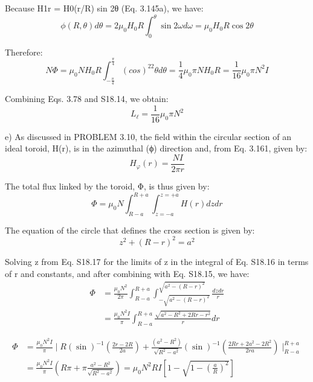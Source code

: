 Because H1r = H0(r/R) sin 2θ (Eq. 3.145a), we have:
 \begin{equation}%
\phi(R,\theta)d\theta=2\mu_0H_0R\int_{0}^{\theta}\sin 2\omega d\omega=\mu_0H_0R\cos 2\theta
\end{equation}

Therefore:
 \begin{equation}%
N\Phi=\mu_0NH_0R\int_{-\frac{\pi}{4}}^{\frac{\pi}{4}}(cos)^22\theta d\theta
=\frac{1}{4}\mu_0\pi NH_0R=\frac{1}{16}\mu_0\pi N^2I
\end{equation}

Combining Eqs. 3.78 and S18.14, we obtain:
 \begin{equation}%
L_\ell=\frac{1}{16}\mu_0\pi N^2
\end{equation}

e) As discussed in PROBLEM 3.10, the field within the circular section of an
ideal toroid, H(r), is in the azimuthal (ϕ) direction and, from Eq. 3.161, given by:
 \begin{equation}%
H_\varphi(r)=\frac{NI}{2\pi r}
\end{equation}


The total flux linked by the toroid, Φ, is thus given by:
 \begin{equation}%
\Phi=\mu_0N\int_{R-a}^{R+a}\int_{z=-a}^{z=+a}H(r)dzdr
\end{equation}

The equation of the circle that defines the cross section is given by:
 \begin{equation}%
z^2+(R-r)^2=a^2
\end{equation}

Solving z from Eq. S18.17 for the limits of z in the integral of Eq. S18.16 in terms
of r and constants, and after combining with Eq. S18.15, we have:
\begin{equation}%
\begin{split}
\Phi&=\frac{\mu_0N^2}{2\pi}\int_{R-a}^{R+a}\int_{-\sqrt{a^2-(R-r)^2}}^{\sqrt{a^2-(R-r)^2}}\frac{dzdr}{r}\\
&=\frac{\mu_0N^2I}{\pi}\int_{R-a}^{R+a}\frac{\sqrt{a^2-R^2+2Rr-r^2}}{r}dr
\end{split}
\end{equation}

\begin{equation}%
\begin{split}
\Phi&=\frac{\mu_0N^2I}{\pi}\mid R(\sin)^{-1}(\frac{2r-2R}{2a})+\frac{(a^2-R^2)}{\sqrt{R^2-a^2}}(\sin)^{-1}(\frac{2Rr+2a^2-2R^2}{2ra})\mid_{R-a}^{R+a} \\
&=\frac{\mu_0N^2I}{\pi}(R\pi+\pi\frac{a^2-R^2}{\sqrt{R^2-a^2}})=\mu_0N^2RI[1-\sqrt{1-(\frac{a}{R})^2}]
\end{split}
\end{equation}


